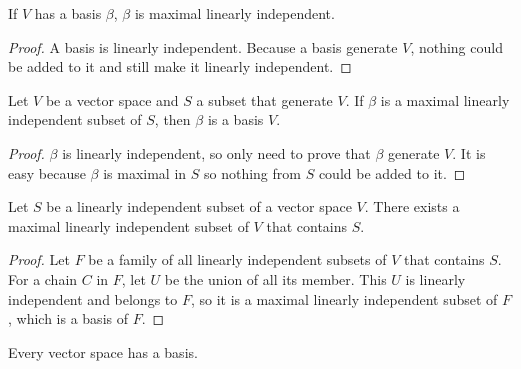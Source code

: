 \begin{theorem}
    If $V$ has a basis $\beta$, $\beta$ is maximal linearly independent.
\end{theorem}
\begin{proof}
    A basis is linearly independent. Because a basis generate $V$, nothing could be added to it and still make it linearly independent.
\end{proof}



\begin{theorem}
    Let $V$ be a vector space and $S$ a subset that generate $V$. If $\beta$ is a maximal linearly independent subset of $S$, then $\beta$ is a basis $V$.    
\end{theorem}
\begin{proof}
    $\beta$ is linearly independent, so only need to prove that $\beta$ generate $V$. It is easy because $\beta$ is maximal in $S$ so nothing from $S$ could be added to it.
\end{proof}

\begin{theorem}
    Let $S$ be a linearly independent subset of a vector space $V$. There exists a maximal linearly independent subset of $V$ that contains $S$.    
\end{theorem}
\begin{proof}
    Let $F$ be a family of all linearly independent subsets of $V$ that contains $S$. For a chain $C$ in $F$, let $U$ be the union of all its member. This $U$ is linearly independent and belongs to $F$, so it is a maximal linearly independent subset of $F$, which is a basis of $F$.
\end{proof}


\begin{theorem}
    Every vector space has a basis.    
\end{theorem}




